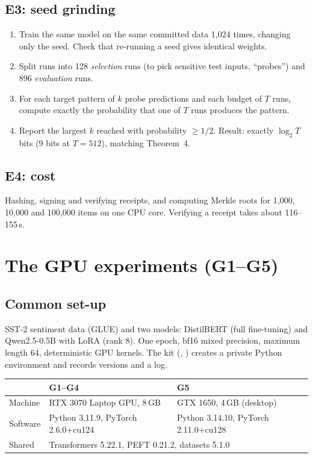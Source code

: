 \subsection{E3: seed grinding}
\begin{enumerate}
\item Train the same model on the same committed data 1,024 times, changing only the seed.
  Check that re-running a seed gives identical weights.
\item Split runs into 128 \emph{selection} runs (to pick sensitive test inputs, ``probes'') and
  896 \emph{evaluation} runs.
\item For each target pattern of $k$ probe predictions and each budget of $T$ runs, compute
  exactly the probability that one of $T$ runs produces the pattern.
\item Report the largest $k$ reached with probability $\ge 1/2$. Result: exactly $\log_2 T$
  bits (9 bits at $T=512$), matching Theorem~4.
\end{enumerate}

\subsection{E4: cost}
Hashing, signing and verifying receipts, and computing Merkle roots for 1,000, 10,000 and
100,000 items on one CPU core. Verifying a receipt takes about 116--155\,\textmu s.

\section{The GPU experiments (G1--G5)}
\subsection{Common set-up}
SST-2 sentiment data (GLUE) and two models: DistilBERT (full fine-tuning) and Qwen2.5-0.5B
with LoRA (rank 8). One epoch, bf16 mixed precision, maximum length 64, deterministic GPU
kernels. The kit (, ) creates a private Python environment
and records versions and a log.

\begin{center}\small
\begin{tabular}{@{}lll@{}}
\toprule
& G1--G4 & G5\\
\midrule
Machine & RTX 3070 Laptop GPU, 8\,GB & GTX 1650, 4\,GB (desktop)\\
Software & Python 3.11.9, PyTorch 2.6.0+cu124 & Python 3.14.10, PyTorch 2.11.0+cu128\\
Shared & \multicolumn{2}{l}{Transformers 5.22.1, PEFT 0.21.2, datasets 5.1.0}\\
\bottomrule
\end{tabular}
\end{center}

